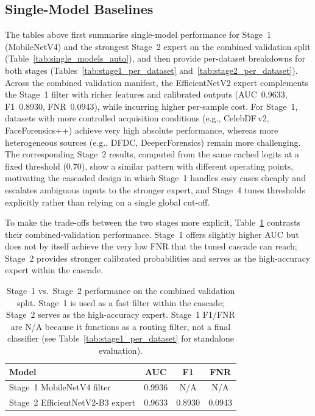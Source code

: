 
\subsection{Single-Model Baselines}
\label{subsec:single_model_baselines}




\noindent The tables above first summarise single\hyp model performance for Stage~1 (MobileNetV4) and the strongest Stage~2 expert on the combined validation split (Table~\ref{tab:single_models_auto}), and then provide per\hyp dataset breakdowns for both stages (Tables~\ref{tab:stage1_per_dataset} and~\ref{tab:stage2_per_dataset}). Across the combined validation manifest, the EfficientNetV2 expert complements the Stage~1 filter with richer features and calibrated outputs (AUC~\num{0.9633}, F1~\num{0.8930}, FNR~\num{0.0943}), while incurring higher per\hyp sample cost. For Stage~1, datasets with more controlled acquisition conditions (e.g., CelebDF\,v2, FaceForensics++) achieve very high absolute performance, whereas more heterogeneous sources (e.g., DFDC, DeeperForensics) remain more challenging. The corresponding Stage~2 results, computed from the same cached logits at a fixed threshold (0.70), show a similar pattern with different operating points, motivating the cascaded design in which Stage~1 handles easy cases cheaply and escalates ambiguous inputs to the stronger expert, and Stage~4 tunes thresholds explicitly rather than relying on a single global cut\hyp off.

\noindent To make the trade\hyp offs between the two stages more explicit, Table~\ref{tab:stage1_stage2_compare} contrasts their combined\hyp validation performance. Stage~1 offers slightly higher AUC but does not by itself achieve the very low FNR that the tuned cascade can reach; Stage~2 provides stronger calibrated probabilities and serves as the high\hyp accuracy expert within the cascade.

\begin{table}[h]
  \centering
  \caption{Stage~1 vs.\ Stage~2 performance on the combined validation split. Stage~1 is used as a fast filter within the cascade; Stage~2 serves as the high-accuracy expert. Stage~1 F1/FNR are N/A because it functions as a routing filter, not a final classifier (see Table~\ref{tab:stage1_per_dataset} for standalone evaluation).}
  \label{tab:stage1_stage2_compare}
  {\small
  \begin{tabular}{lccc}
    \toprule
    Model & AUC & F1 & FNR \\
    \midrule
    Stage~1 MobileNetV4 filter & 0.9936 & N/A & N/A \\
    Stage~2 EfficientNetV2-B3 expert & 0.9633 & 0.8930 & 0.0943 \\
    \bottomrule
  \end{tabular}}
\end{table}

